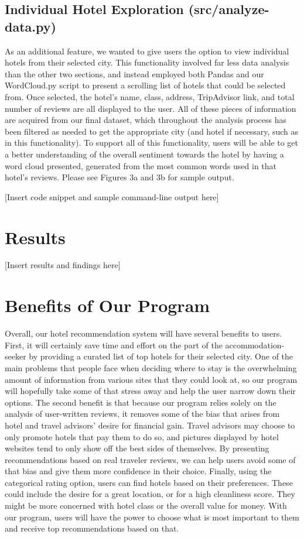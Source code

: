 \documentclass[conference]{IEEEtran}
\begin{document}
	\subsection{Individual Hotel Exploration (src/analyze-data.py)}
	As an additional feature, we wanted to give users the option to view individual hotels from their selected city. This functionality involved far less data analysis than the other two sections, and instead employed both Pandas and our WordCloud.py script to present a scrolling list of hotels that could be selected from. Once selected, the hotel’s name, class, address, TripAdvisor link, and total number of reviews are all displayed to the user. All of these pieces of information are acquired from our final dataset, which throughout the analysis process has been filtered as needed to get the appropriate city (and hotel if necessary, such as in this functionality). To support all of this functionality, users will be able to get a better understanding of the overall sentiment towards the hotel by having a word cloud presented, generated from the most common words used in that hotel’s reviews. Please see Figures 3a and 3b for sample output.
	
	[Insert code snippet and sample command-line output here]
	
	\section{Results}
	[Insert results and findings here]
	
	\section{Benefits of Our Program}
	Overall, our hotel recommendation system will have several benefits to users. First, it will certainly save time and effort on the part of the accommodation-seeker by providing a curated list of top hotels for their selected city. One of the main problems that people face when deciding where to stay is the overwhelming amount of information from various sites that they could look at, so our program will hopefully take some of that stress away and help the user narrow down their options. 
	The second benefit is that because our program relies solely on the analysis of user-written reviews, it removes some of the bias that arises from hotel and travel advisors’ desire for financial gain. Travel advisors may choose to only promote hotels that pay them to do so, and pictures displayed by hotel websites tend to only show off the best sides of themselves. By presenting recommendations based on real traveler reviews, we can help users avoid some of that bias and give them more confidence in their choice.
	Finally, using the categorical rating option, users can find hotels based on their preferences. These could include the desire for a great location, or for a high cleanliness score. They might be more concerned with hotel class or the overall value for money. With our program, users will have the power to choose what is most important to them and receive top recommendations based on that.
	
\end{document}
